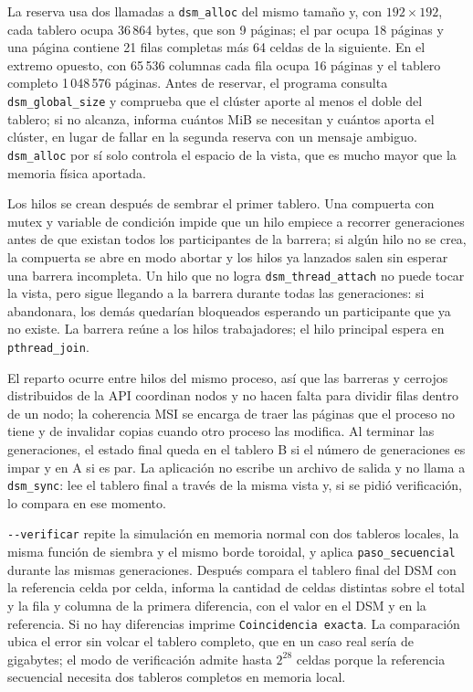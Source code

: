 La reserva usa dos llamadas a \texttt{dsm\_alloc} del mismo tamaño y, con $192 \times 192$, cada tablero ocupa 36\,864 bytes, que son 9 páginas; el par ocupa 18 páginas y una página contiene 21 filas completas más 64 celdas de la siguiente. En el extremo opuesto, con 65\,536 columnas cada fila ocupa 16 páginas y el tablero completo 1\,048\,576 páginas. Antes de reservar, el programa consulta \texttt{dsm\_global\_size} y comprueba que el clúster aporte al menos el doble del tablero; si no alcanza, informa cuántos MiB se necesitan y cuántos aporta el clúster, en lugar de fallar en la segunda reserva con un mensaje ambiguo. \texttt{dsm\_alloc} por sí solo controla el espacio de la vista, que es mucho mayor que la memoria física aportada.

Los hilos se crean después de sembrar el primer tablero. Una compuerta con mutex y variable de condición impide que un hilo empiece a recorrer generaciones antes de que existan todos los participantes de la barrera; si algún hilo no se crea, la compuerta se abre en modo abortar y los hilos ya lanzados salen sin esperar una barrera incompleta. Un hilo que no logra \texttt{dsm\_thread\_attach} no puede tocar la vista, pero sigue llegando a la barrera durante todas las generaciones: si abandonara, los demás quedarían bloqueados esperando un participante que ya no existe. La barrera reúne a los hilos trabajadores; el hilo principal espera en \texttt{pthread\_join}.

El reparto ocurre entre hilos del mismo proceso, así que las barreras y cerrojos distribuidos de la API coordinan nodos y no hacen falta para dividir filas dentro de un nodo; la coherencia MSI se encarga de traer las páginas que el proceso no tiene y de invalidar copias cuando otro proceso las modifica. Al terminar las generaciones, el estado final queda en el tablero B si el número de generaciones es impar y en A si es par. La aplicación no escribe un archivo de salida y no llama a \texttt{dsm\_sync}: lee el tablero final a través de la misma vista y, si se pidió verificación, lo compara en ese momento.

\texttt{-{}-verificar} repite la simulación en memoria normal con dos tableros locales, la misma función de siembra y el mismo borde toroidal, y aplica \texttt{paso\_secuencial} durante las mismas generaciones. Después compara el tablero final del DSM con la referencia celda por celda, informa la cantidad de celdas distintas sobre el total y la fila y columna de la primera diferencia, con el valor en el DSM y en la referencia. Si no hay diferencias imprime \texttt{Coincidencia exacta}. La comparación ubica el error sin volcar el tablero completo, que en un caso real sería de gigabytes; el modo de verificación admite hasta $2^{28}$ celdas porque la referencia secuencial necesita dos tableros completos en memoria local.

